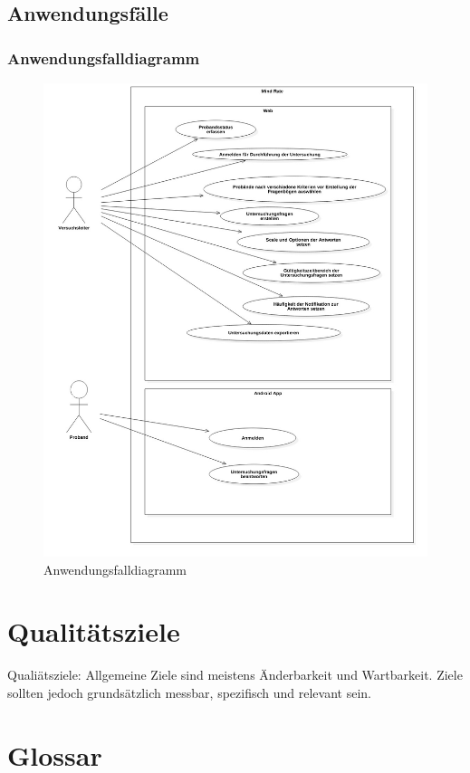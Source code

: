 \documentclass[a4paper]{scrreprt}
\begin{document}
        \section{Anwendungsf\"alle}

            \newpage
            \subsection{Anwendungsfalldiagramm}
                \vspace{0.4cm}
                \begin{figure}
                    \centering
                    \includegraphics[scale = 0.4]{UseCaseDiagram1.jpg}
                    \caption{Anwendungsfalldiagramm}
                \end{figure}

        \newpage

    \chapter{Qualitätsziele}
        Qualiätsziele: Allgemeine Ziele sind meistens Änderbarkeit und Wartbarkeit.
        Ziele sollten jedoch grundsätzlich messbar, spezifisch und relevant sein.

    \chapter{Glossar}

    \listoffigures
\end{document}
